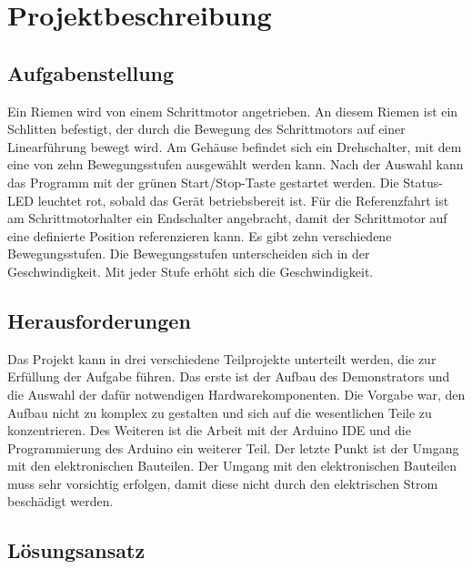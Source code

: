 %
%
%


\chapter{Projektbeschreibung}

\section{Aufgabenstellung}

Ein Riemen wird von einem Schrittmotor angetrieben. An diesem Riemen ist ein Schlitten befestigt, der durch die Bewegung des Schrittmotors auf einer Linearführung bewegt wird. Am Gehäuse befindet sich ein Drehschalter, mit dem eine von zehn Bewegungsstufen ausgewählt werden kann. Nach der Auswahl kann das Programm mit der grünen Start/Stop-Taste gestartet werden. Die Status-LED leuchtet rot, sobald das Gerät betriebsbereit ist. Für die Referenzfahrt ist am Schrittmotorhalter ein Endschalter angebracht, damit der Schrittmotor auf eine definierte Position referenzieren kann. Es gibt zehn verschiedene Bewegungsstufen. Die Bewegungsstufen unterscheiden sich in der Geschwindigkeit. Mit jeder Stufe erhöht sich die Geschwindigkeit.

\section{Herausforderungen} 

Das Projekt kann in drei verschiedene Teilprojekte unterteilt werden, die zur Erfüllung der Aufgabe führen. Das erste ist der Aufbau des Demonstrators und die Auswahl der dafür notwendigen Hardwarekomponenten. Die Vorgabe war, den Aufbau nicht zu komplex zu gestalten und sich auf die wesentlichen Teile zu konzentrieren. Des Weiteren ist die Arbeit mit der Arduino IDE und die Programmierung des Arduino ein weiterer Teil. Der letzte Punkt ist der Umgang mit den elektronischen Bauteilen. Der Umgang mit den elektronischen Bauteilen muss sehr vorsichtig erfolgen, damit diese nicht durch den elektrischen Strom beschädigt werden.

\section{Lösungsansatz}

